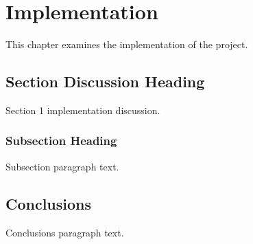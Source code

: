 \chapter{Implementation}\label{ch:Implementation}

This chapter examines the implementation of the project.

\section{Section Discussion Heading}

Section 1 implementation discussion.

\subsection{Subsection Heading}
Subsection paragraph text.

\section{Conclusions}
Conclusions paragraph text.





